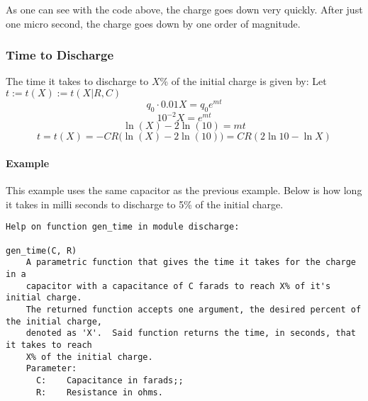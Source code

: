 \leavevmode{}%
As one can see with the code above, the charge goes down very quickly.
After just one micro second, the charge goes down by one order of
magnitude.

\hypertarget{74199df5}{}
\hypertarget{time-to-discharge}{%
\subsubsection{Time to Discharge}\label{time-to-discharge}}

The time it takes to discharge to \(X\)\% of the initial charge is given
by: Let \(t:=t(X):=t(X \vert R, C)\) \[ q_0 \cdot 0.01X = q_0e^{mt} \]
\[ 10^{-2}X = e^{mt}\] \[ \ln(X)-2\ln(10) = mt\]
\[ t = t(X) = - CR\big(\ln(X)-2\ln(10)\big) = CR(2\ln10 - \ln X)\]

\hypertarget{example}{%
\paragraph{Example}\label{example}}

This example uses the same capacitor as the previous example. Below is
how long it takes in milli seconds to discharge to 5\% of the initial
charge.

\hypertarget{4f58b735}{}
\begin{Shaded}
\begin{Highlighting}[]
\end{Highlighting}
\end{Shaded}

\begin{verbatim}
Help on function gen_time in module discharge:

gen_time(C, R)
    A parametric function that gives the time it takes for the charge in a 
    capacitor with a capacitance of C farads to reach X% of it's initial charge.
    The returned function accepts one argument, the desired percent of the initial charge,
    denoted as 'X'.  Said function returns the time, in seconds, that it takes to reach
    X% of the initial charge.
    Parameter:
      C:    Capacitance in farads;;
      R:    Resistance in ohms.

\end{verbatim}

\hypertarget{5b365c38}{}
\begin{Shaded}
\begin{Highlighting}[]
\OperatorTok{=}\NormalTok{, }\NormalTok{)}
\NormalTok{(}\SpecialCharTok{\{}\NormalTok{)}\SpecialCharTok{\{}\NormalTok{)}\OperatorTok{*}\NormalTok{)}
\end{Highlighting}
\end{Shaded}

